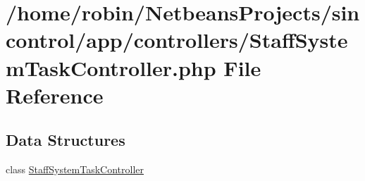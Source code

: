 \hypertarget{_staff_system_task_controller_8php}{}\section{/home/robin/\+Netbeans\+Projects/sincontrol/app/controllers/\+Staff\+System\+Task\+Controller.php File Reference}
\label{_staff_system_task_controller_8php}
\subsection*{Data Structures}
\begin{DoxyCompactItemize}
\item 
class \hyperlink{class_staff_system_task_controller}{Staff\+System\+Task\+Controller}
\end{DoxyCompactItemize}
